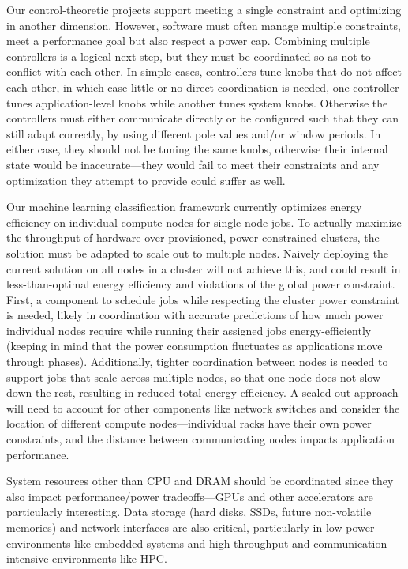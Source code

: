 Our control-theoretic projects support meeting a single constraint and optimizing in another dimension.
However, software must often manage multiple constraints, \eg meet a performance goal but also respect a power cap.
Combining multiple controllers is a logical next step, but they must be coordinated so as not to conflict with each other.
In simple cases, controllers tune knobs that do not affect each other, in which case little or no direct coordination is needed, \eg one controller tunes application-level knobs while another tunes system knobs.
Otherwise the controllers must either communicate directly or be configured such that they can still adapt correctly, \eg by using different pole values and/or window periods.
In either case, they should not be tuning the same knobs, otherwise their internal state would be inaccurate---they would fail to meet their constraints and any optimization they attempt to provide could suffer as well.

Our machine learning classification framework currently optimizes energy efficiency on individual compute nodes for single-node jobs.
To actually maximize the throughput of hardware over-provisioned, power-constrained clusters, the solution must be adapted to scale out to multiple nodes.
Naively deploying the current solution on all nodes in a cluster will not achieve this, and could result in less-than-optimal energy efficiency and violations of the global power constraint.
First, a component to schedule jobs while respecting the cluster power constraint is needed, likely in coordination with accurate predictions of how much power individual nodes require while running their assigned jobs energy-efficiently (keeping in mind that the power consumption fluctuates as applications move through phases).
Additionally, tighter coordination between nodes is needed to support jobs that scale across multiple nodes, so that one node does not slow down the rest, resulting in reduced total energy efficiency.
A scaled-out approach will need to account for other components like network switches and consider the location of different compute nodes---individual racks have their own power constraints, and the distance between communicating nodes impacts application performance.

System resources other than CPU and DRAM should be coordinated since they also impact performance/power tradeoffs---GPUs and other accelerators are particularly interesting.
Data storage (\eg hard disks, SSDs, future non-volatile memories) and network interfaces are also critical, particularly in low-power environments like embedded systems and high-throughput and communication-intensive environments like HPC.

